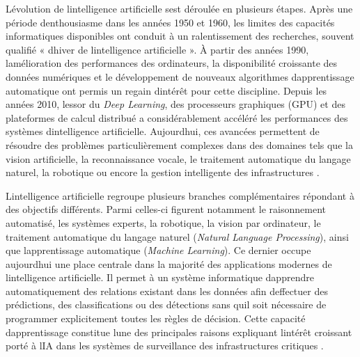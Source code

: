 \documentclass[12pt,a4paper,oneside]{report}
\begin{document}
L\textquotesingle évolution de l\textquotesingle intelligence
artificielle s\textquotesingle est déroulée en plusieurs étapes. Après
une période d\textquotesingle enthousiasme dans les années 1950 et 1960,
les limites des capacités informatiques disponibles ont conduit à un
ralentissement des recherches, souvent qualifié «
d\textquotesingle hiver de l\textquotesingle intelligence artificielle
». À partir des années 1990, l\textquotesingle amélioration des
performances des ordinateurs, la disponibilité croissante des données
numériques et le développement de nouveaux algorithmes
d\textquotesingle apprentissage automatique ont permis un regain
d\textquotesingle intérêt pour cette discipline. Depuis les années 2010,
l\textquotesingle essor du \emph{Deep Learning}, des processeurs
graphiques (GPU) et des plateformes de calcul distribué a
considérablement accéléré les performances des systèmes
d\textquotesingle intelligence artificielle.
Aujourd\textquotesingle hui, ces avancées permettent de résoudre des
problèmes particulièrement complexes dans des domaines tels que la
vision artificielle, la reconnaissance vocale, le traitement automatique
du langage naturel, la robotique ou encore la gestion intelligente des
infrastructures \cite{ref68}.

L\textquotesingle intelligence artificielle regroupe plusieurs branches
complémentaires répondant à des objectifs différents. Parmi celles-ci
figurent notamment le raisonnement automatisé, les systèmes experts, la
robotique, la vision par ordinateur, le traitement automatique du
langage naturel (\emph{Natural Language Processing}), ainsi que
l\textquotesingle apprentissage automatique (\emph{Machine Learning}).
Ce dernier occupe aujourd\textquotesingle hui une place centrale dans la
majorité des applications modernes de l\textquotesingle intelligence
artificielle. Il permet à un système informatique
d\textquotesingle apprendre automatiquement des relations existant dans
les données afin d\textquotesingle effectuer des prédictions, des
classifications ou des détections sans qu\textquotesingle il soit
nécessaire de programmer explicitement toutes les règles de décision.
Cette capacité d\textquotesingle apprentissage constitue
l\textquotesingle une des principales raisons expliquant
l\textquotesingle intérêt croissant porté à l\textquotesingle IA dans
les systèmes de surveillance des infrastructures critiques \cite{ref69}.
\end{document}
